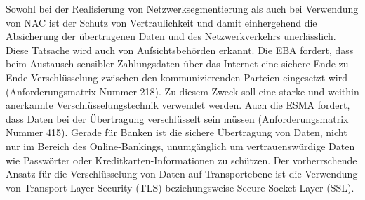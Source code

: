 \bigbreak
Sowohl bei der Realisierung von Netzwerksegmentierung als auch bei Verwendung von NAC ist der Schutz von Vertraulichkeit und damit einhergehend die Absicherung der übertragenen Daten und des Netzwerkverkehrs unerlässlich. Diese Tatsache wird auch von Aufsichtsbehörden erkannt. Die EBA fordert, dass beim Austausch sensibler Zahlungsdaten über das Internet eine sichere Ende-zu-Ende-Verschlüsselung zwischen den kommunizierenden Parteien eingesetzt wird (Anforderungsmatrix Nummer 218). Zu diesem Zweck soll eine starke und weithin anerkannte Verschlüsselungstechnik verwendet werden. Auch die ESMA fordert, dass Daten bei der Übertragung verschlüsselt sein müssen (Anforderungsmatrix Nummer 415). Gerade für Banken ist die sichere Übertragung von Daten, nicht nur im Bereich des Online-Bankings, unumgänglich um vertrauenswürdige Daten wie Passwörter oder Kreditkarten-Informationen zu schützen. Der vorherrschende Ansatz für die Verschlüsselung von Daten auf Transportebene ist die Verwendung von \glqq{}Transport Layer Security (TLS)\grqq{} beziehungsweise \glqq{}Secure Socket Layer (SSL)\grqq{}. \autocite{SchwenkJörg2020SuKi}

